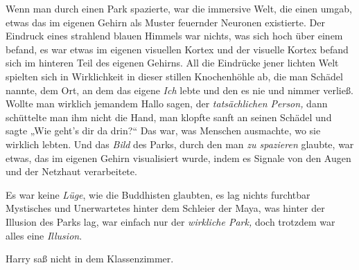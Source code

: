 Wenn man durch einen Park spazierte, war die immersive Welt, die einen umgab, etwas das im eigenen Gehirn als Muster feuernder Neuronen existierte. Der Eindruck eines strahlend blauen Himmels war nichts, was sich hoch über einem befand, es war etwas im eigenen visuellen Kortex und der visuelle Kortex befand sich im hinteren Teil des eigenen Gehirns. All die Eindrücke jener lichten Welt spielten sich in Wirklichkeit in dieser stillen Knochenhöhle ab, die man Schädel nannte, dem Ort, an dem das eigene \emph{Ich} lebte und den es nie und nimmer verließ. Wollte man wirklich jemandem Hallo sagen, der \emph{tatsächlichen Person,} dann schüttelte man ihm nicht die Hand, man klopfte sanft an seinen Schädel und sagte „Wie geht’s dir da drin?“ Das war, was Menschen ausmachte, wo sie wirklich lebten. Und das \emph{Bild} des Parks, durch den man \emph{zu spazieren} glaubte, war etwas, das im eigenen Gehirn visualisiert wurde, indem es Signale von den Augen und der Netzhaut verarbeitete.

Es war keine \emph{Lüge}, wie die Buddhisten glaubten, es lag nichts furchtbar Mystisches und Unerwartetes hinter dem Schleier der Maya, was hinter der Illusion des Parks lag, war einfach nur der \emph{wirkliche Park,} doch trotzdem war alles eine \emph{Illusion}.

Harry saß nicht in dem Klassenzimmer.

